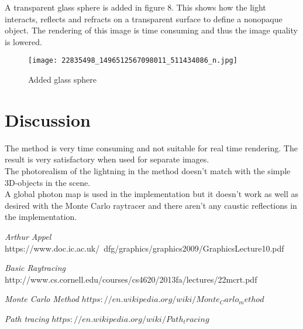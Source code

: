 \documentclass[a4paper,12pt]{IEEEtran}
\begin{document}
A transparent glass sphere is added in figure 8. This shows how the light interacts, reflects and refracts on a transparent surface to define a nonopaque object. The rendering of this image is time consuming and thus the image quality is lowered. 
\begin{figure}[h!]
\texttt{[image: 22835498\_1496512567098011\_511434086\_n.jpg]}
\caption{Added glass sphere}
\end{figure}

\section{Discussion}
The method is very time consuming and not suitable for real time rendering. The result is very satisfactory when used for separate images. \\
The photorealism of the lightning in the method doesn't match with the simple 3D-objects in the scene.
\\
A global photon map is used in the implementation but it doesn't work as well as desired with the Monte Carlo raytracer and there aren't any caustic reflections in the implementation.
\begin{thebibliography}{00}
\emph{Arthur Appel}\newline
https://www.doc.ic.ac.uk/~dfg/graphics/graphics2009/GraphicsLecture10.pdf

\emph{Basic Raytracing}\newline
http://www.cs.cornell.edu/courses/cs4620/2013fa/lectures/22mcrt.pdf

\emph{Monte Carlo Method}\newline
$https://en.wikipedia.org/wiki/Monte_Carlo_method$

\emph{Path tracing}\newline
$https://en.wikipedia.org/wiki/Path_tracing$

\end{thebibliography}
\end{document}
